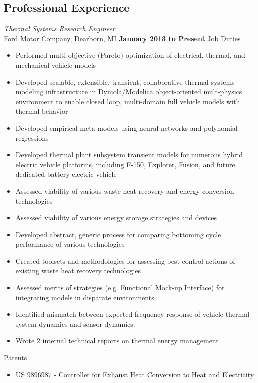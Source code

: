 \documentclass[centered]{res}
\begin{document}
\begin{resume}
\section{Professional Experience}
\textit{Thermal Systems Research Engineer} \\
Ford Motor Company, Dearborn, MI
\hfill \textbf{January 2013 to Present} 
\newline Job Duties
\begin{itemize} \itemsep -2pt %
\item Performed multi-objective (Pareto) optimization of electrical,
  thermal, and mechanical vehicle models
\item Developed scalable, extensible, transient, collaborative thermal
  systems modeling infrastructure in Dymola/Modelica object-oriented
  mult-physics environment to enable closed loop, multi-domain full
  vehicle models with thermal behavior
\item Developed empirical meta models using neural networks and
  polynomial regressions
\item Developed thermal plant subsystem transient models for numerous
  hybrid electric vehicle platforms, including F-150, Explorer,
  Fusion, and future dedicated battery electric vehicle
\item Assessed viability of various waste heat recovery and energy
  conversion technologies
\item Assessed viability of various energy storage strategies and devices
\item Developed abstract, generic process for comparing bottoming
  cycle performance of various technologies
\item Created toolsets and methodologies for assessing best control
  actions of existing waste heat recovery technologies
\item Assessed merits of strategies (e.g. Functional Mock-up
  Interface) for integrating models in disparate environments
\item Identified mismatch between expected frequency response of
  vehicle thermal system dynamics and sensor dynamics.
\item Wrote 2 internal technical reports on thermal energy management
\end{itemize} \vspace{-8pt} 
\newpage
Patents
\begin{itemize} \itemsep -2pt %
\item US 9896987 - Controller for Exhaust Heat Conversion to Heat and Electricity

\end{itemize}
\end{resume}
\end{document}
